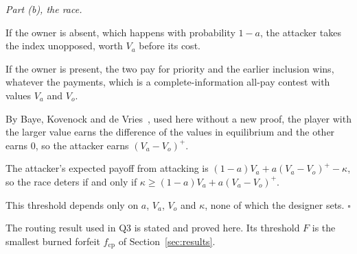 \documentclass[11pt]{article}
\newenvironment{steps}{\begin{list}{}{\setlength{\leftmargin}{3.6em}\setlength{\labelwidth}{3.2em}\setlength{\labelsep}{0.4em}\setlength{\itemsep}{2pt}\setlength{\topsep}{3pt}\setlength{\parsep}{0pt}\renewcommand{\makelabel}[1]{##1\hfil}}}{\end{list}}
\begin{document}
\emph{Part (b), the race.}
\begin{steps}
\item[\emph{Step 7.}] If the owner is absent, which happens with probability $1-a$, the attacker takes the index unopposed, worth $V_a$ before its cost.
\item[\emph{Step 8.}] If the owner is present, the two pay for priority and the earlier inclusion wins, whatever the payments, which is a complete-information all-pay contest with values $V_a$ and $V_o$.
\item[\emph{Step 9.}] By Baye, Kovenock and de Vries~\cite{baye1996allpay}, used here without a new proof, the player with the larger value earns the difference of the values in equilibrium and the other earns $0$, so the attacker earns $(V_a-V_o)^+$.
\item[\emph{Step 10.}] The attacker's expected payoff from attacking is $(1-a)V_a+a(V_a-V_o)^+-\kappa$, so the race deters if and only if $\kappa\ge(1-a)V_a+a(V_a-V_o)^+$.
\item[\emph{Step 11.}] This threshold depends only on $a$, $V_a$, $V_o$ and $\kappa$, none of which the designer sets. \hfill$\square$
\end{steps}

The routing result used in Q3 is stated and proved here. Its threshold $F$ is the smallest burned forfeit $f_{\mathrm{cp}}$ of Section~\ref{sec:results}.
\end{document}
